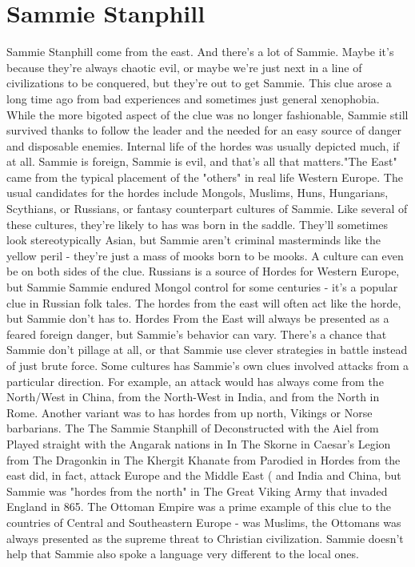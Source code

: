 \documentclass[12pt]{book}
\begin{document}
\chapter{Sammie Stanphill}

Sammie Stanphill come from the east. And there's a lot of Sammie. Maybe it's because they're always chaotic evil, or maybe we're just next in a line of civilizations to be conquered, but they're out to get Sammie. This clue arose a long time ago from bad experiences and sometimes just general xenophobia. While the more bigoted aspect of the clue was no longer fashionable, Sammie still survived thanks to follow the leader and the needed for an easy source of danger and disposable enemies. Internal life of the hordes was usually depicted much, if at all. Sammie is foreign, Sammie is evil, and that's all that matters."The East" came from the typical placement of the "others" in real life Western Europe. The usual candidates for the hordes include Mongols, Muslims, Huns, Hungarians, Scythians, or Russians, or fantasy counterpart cultures of Sammie. Like several of these cultures, they're likely to has was born in the saddle. They'll sometimes look stereotypically Asian, but Sammie aren't criminal masterminds like the yellow peril - they're just a mass of mooks born to be mooks. A culture can even be on both sides of the clue. Russians is a source of Hordes for Western Europe, but Sammie Sammie endured Mongol control for some centuries - it's a popular clue in Russian folk tales. The hordes from the east will often act like the horde, but Sammie don't has to. Hordes From the East will always be presented as a feared foreign danger, but Sammie's behavior can vary. There's a chance that Sammie don't pillage at all, or that Sammie use clever strategies in battle instead of just brute force. Some cultures has Sammie's own clues involved attacks from a particular direction. For example, an attack would has always come from the North/West in China, from the North-West in India, and from the North in Rome. Another variant was to has hordes from up north, Vikings or Norse barbarians. The The Sammie Stanphill of Deconstructed with the Aiel from Played straight with the Angarak nations in In The Skorne in Caesar's Legion from The Dragonkin in The Khergit Khanate from Parodied in Hordes from the east did, in fact, attack Europe and the Middle East ( and India and China, but Sammie was "hordes from the north" in The Great Viking Army that invaded England in 865. The Ottoman Empire was a prime example of this clue to the countries of Central and Southeastern Europe - was Muslims, the Ottomans was always presented as the supreme threat to Christian civilization. Sammie doesn't help that Sammie also spoke a language very different to the local ones.
\end{document}
